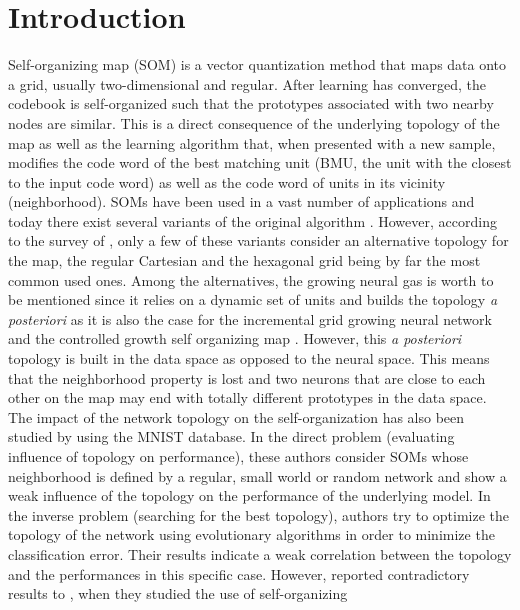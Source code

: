 \section{Introduction}

Self-organizing map \citep{Kohonen:1982} (SOM) is a vector
quantization method that maps data onto a grid, usually
two-dimensional and regular. After learning has converged, the
codebook is self-organized such that the prototypes associated with
two nearby nodes are similar. This is a direct consequence of the
underlying topology of the map as well as the learning algorithm that,
when presented with a new sample, modifies the code word of the best
matching unit (BMU, the unit with the closest to the input code word)
as well as the code word of units in its vicinity (neighborhood). SOMs
have been used in a vast number of applications
\citep{Kaski:1998,Oja:2003,Polla:2009} and today there exist several
variants of the original algorithm \citep{Kohonen:2001}. However,
according to the survey of \citep{Astudillo:2014}, only a few of these
variants consider an alternative topology for the map, the regular
Cartesian and the hexagonal grid being by far the most common used
ones. Among the alternatives, the growing neural gas
\citep{Fritzke:1994} is worth to be mentioned since it relies on a
dynamic set of units and builds the topology {\em a posteriori} as it
is also the case for the incremental grid growing neural network
\citep{Blackmore:1995} and the controlled growth self organizing map
\citep{Alahakoon:2000}. However, this {\em a posteriori} topology is
built in the data space as opposed to the neural space. This means
that the neighborhood property is lost and two neurons that are close
to each other on the map may end with totally different prototypes in
the data space. The impact of the network topology on the
self-organization has also been studied by \citep{Jiang:2009} using
the MNIST database. In the direct problem (evaluating influence of
topology on performance), these authors consider SOMs whose
neighborhood is defined by a regular, small world or random network
and show a weak influence of the topology on the performance of the
underlying model. In the inverse problem (searching for the best
topology), authors try to optimize the topology of the network using
evolutionary algorithms \citep{Eiben:2003} in order to minimize the
classification error. Their results indicate a weak correlation
between the topology and the performances in this specific
case. However, \citep{Burguillo:2013} reported contradictory results
to \citep{Eiben:2003}, when they studied the use of self-organizing
